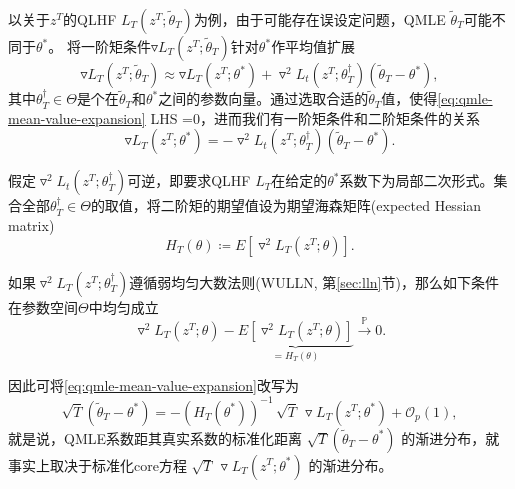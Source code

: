 以关于$z^{T}$的QLHF $L_{T} \left( z^{T}; \tilde{\theta}_{T} \right)$为例，由于可能存在误设定问题，QMLE $\tilde{\theta}_{T}$可能不同于$\theta^{*}$。
将一阶矩条件$\triangledown L_{T} \left( z^{T}; \tilde{\theta}_{T} \right)$针对$\theta^{*}$作平均值扩展
\begin{equation}
    \label{eq:qmle-mean-value-expansion}
    \triangledown L_{T} \left( z^{T}; \tilde{\theta}_{T} \right) \approx
    \triangledown L_{T} \left(z^{T}; \theta^{*} \right)
    + \triangledown^{2} L_{t} \left(z^{T}; \theta_{T}^{\dagger} \right) \left(\tilde{\theta}_{T} - \theta^{*} \right),
\end{equation}
其中$\theta_{T}^{\dagger} \in \Theta$是个在$\tilde{\theta}_{T}$和$\theta^{*}$之间的参数向量。通过选取合适的$\tilde{\theta}_{T}$值，使得\eqref{eq:qmle-mean-value-expansion} LHS =0，进而我们有一阶矩条件和二阶矩条件的关系
\begin{equation*}
    \triangledown L_{T} \left(z^{T}; \theta^{*} \right)
    = -\triangledown^{2} L_{t} \left(z^{T}; \theta_{T}^{\dagger} \right) \left(\tilde{\theta}_{T} - \theta^{*} \right).
\end{equation*}

假定$\triangledown^{2} L_{t} \left(z^{T}; \theta_{T}^{\dagger} \right)$可逆，即要求QLHF $L_{T}$在给定的$\theta^{*}$系数下为局部二次形式。集合全部$\theta_{T}^{\dagger} \in \Theta$的取值，将二阶矩的期望值设为期望海森矩阵(expected Hessian matrix)
\begin{equation}
    \label{eq:qmle-hessian-matrix-def}
    H_{T} \left( \theta \right) \coloneqq E
    \left[
    \triangledown^{2} L_{T} \left( z^{T}; \theta \right)
    \right].
\end{equation}

如果$\triangledown^{2} L_{T} \left(z^{T}; \theta_{T}^{\dagger} \right)$遵循弱均匀大数法则(WULLN, 第\ref{sec:lln}节)，那么如下条件在参数空间$\Theta$中均匀成立
\begin{equation*}
    \triangledown^{2} L_{T} \left( z^{T}; \theta \right)
    -\underbrace{
    E
    \left[
    \triangledown^{2} L_{T} \left( z^{T}; \theta \right)
    \right]
    } _{=H_{T} \left( \theta \right)}
    \overset{\mathbb{P}}{\longrightarrow} 0.
\end{equation*}

因此可将\eqref{eq:qmle-mean-value-expansion}改写为
\begin{equation}
    \label{eq:qmle-mean-value-expansion-hessian}
    \sqrt{T} \left( \tilde{\theta}_{T} - \theta^{*} \right)
    = - \left( H_{T} \left(\theta^{*} \right) \right)^{-1} \,
    \sqrt{T} \,
    \triangledown L_{T} \left( z^{T}; \theta^{*} \right)
    + \mathcal{O}_{p} \left( 1 \right),
\end{equation}
就是说，QMLE系数距其真实系数的标准化距离 $\sqrt{T} \left( \tilde{\theta}_{T} - \theta^{*} \right)$ 的渐进分布，就事实上取决于标准化core方程 $\sqrt{T} \,
\triangledown L_{T} \left( z^{T}; \theta^{*} \right)$ 的渐进分布。

